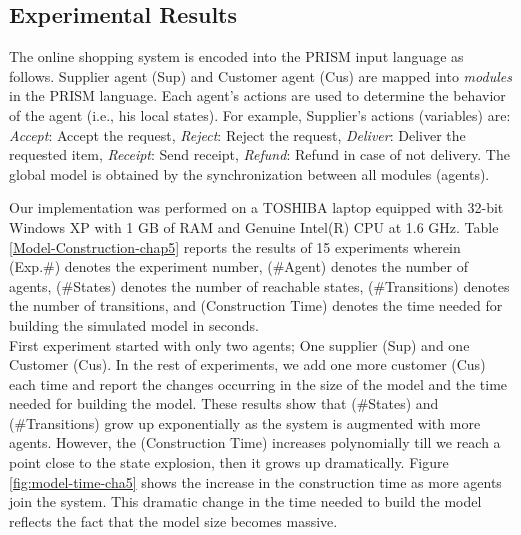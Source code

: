 
\subsection{Experimental Results}\label{sec:Experimental-results-cha5}

The online shopping system is encoded into the PRISM input
language as follows. Supplier agent (Sup) and Customer agent (Cus)
are mapped into \emph{modules} in the PRISM language. Each agent's
actions are used to determine the behavior of the agent (i.e., his
local states). For example, Supplier's actions (variables) are:
\textit{Accept}: Accept the request, \textit{Reject}: Reject the
request, \textit{Deliver}: Deliver the requested item,
\textit{Receipt}: Send receipt, \textit{Refund}: Refund in case of
not delivery. The global model is obtained by the synchronization
between all modules (agents).

Our implementation was performed on a TOSHIBA laptop equipped with
32-bit Windows XP with 1 GB of RAM and Genuine Intel(R) CPU at 1.6
GHz. Table \ref{Model-Construction-chap5} reports the results of 15
experiments wherein (Exp.\#) denotes the experiment number,
(\#Agent) denotes the number of agents, (\#States) denotes the
number of reachable states, (\#Transitions) denotes the number of
transitions, and (Construction Time) denotes the time needed for
building the simulated model in seconds. \\

First experiment started with only two agents; One supplier (Sup) and one Customer (Cus). In the rest of experiments, we add one more customer (Cus) each time and report the changes occurring in the size of the model and
the time needed for building the model. These results show that (\#States) and (\#Transitions) grow up exponentially as the system is augmented with more agents. However, the (Construction Time) increases polynomially till we reach a point close to the state
explosion, then it grows up dramatically. Figure
\ref{fig:model-time-cha5} shows the increase in the construction
time as more agents join the system. This dramatic change in the
time needed to build the model reflects the fact that the model
size becomes massive.

